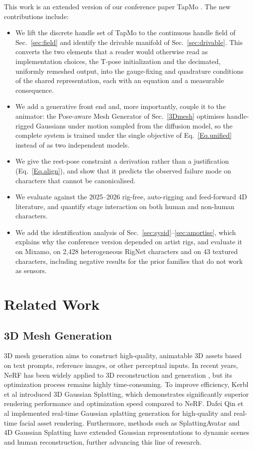 \documentclass[lettersize,journal]{IEEEtran}
\newcommand{\rev}[1]{{\color{red}#1}}
\newcommand{\blu}[1]{\texorpdfstring{{\leavevmode\color{blue}#1}}{#1}}
\begin{document}
This work is an \blu{extended version} of our conference paper TapMo \cite{ICLR2024_94154162}. The new contributions include:
\begin{itemize}
\item We lift the discrete handle set of TapMo to the continuous handle field of
Sec.~\ref{sec:field} and identify the drivable manifold of Sec.~\ref{sec:drivable}. This
converts the two elements that a reader would otherwise read as implementation choices, the
T-pose initialization and the decimated, uniformly remeshed output, into the gauge-fixing and
quadrature conditions of the shared representation, each with an equation and a measurable
consequence.
\item We add a generative front end and, more importantly, couple it to the animator: the
Pose-aware Mesh Generator of Sec.~\ref{3Dmesh} optimises handle-rigged Gaussians under motion
sampled from the diffusion model, so the complete system is trained under the single objective
of Eq.~\ref{Eq.unified} instead of as two independent models.
\item We give the rest-pose constraint a derivation rather than a justification
(Eq.~\ref{Eq.align}), and show that it predicts the observed failure mode on characters that
cannot be canonicalised.
\item We evaluate against the 2025--2026 rig-free, auto-rigging and feed-forward 4D
literature, and quantify stage interaction on both human and non-human characters.
\item \rev{We add the identification analysis of Sec.~\ref{sec:sysid}--\ref{sec:amortise},
which explains why the conference version depended on artist rigs, and evaluate it on
Mixamo, on 2,428 heterogeneous RigNet characters and on 43 textured characters, including
negative results for the prior families that do not work as sensors.}
\end{itemize}


\section{Related Work}

\subsection{3D Mesh Generation}
3D mesh generation aims to construct high-quality, animatable 3D assets based on text prompts, reference images, or other perceptual inputs. In recent years, NeRF \cite{mildenhall2021nerf} has been widely applied to 3D reconstruction and generation \cite{yu2021pixelnerf,gao2022mps,chen2023structnerf}, but its optimization process remains highly time-consuming. To improve efficiency, Kerbl et al \cite{kerbl20233d} introduced 3D Gaussian Splatting, which demonstrates significantly superior rendering performance and optimization speed compared to NeRF. Dafei Qin et al \cite{qin2025instant} implemented real-time Gaussian splatting generation for high-quality and real-time facial asset rendering. Furthermore, methods such as SplattingAvatar  \cite{shao2024splattingavatar} and 4D Gaussian Splatting \cite{wu20244d} have extended Gaussian representations to dynamic scenes and human reconstruction, further advancing this line of research.
\end{document}
